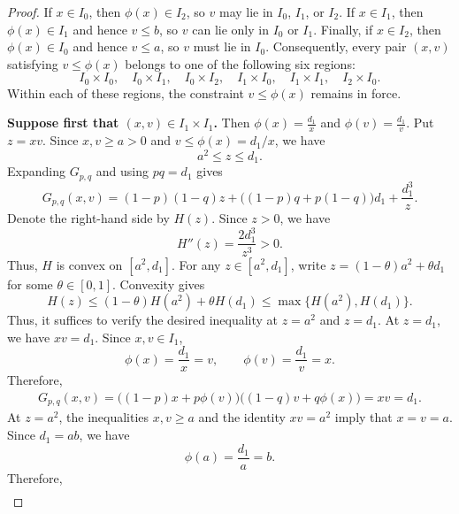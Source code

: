 \documentclass[10pt,a4paper]{amsart}
\begin{document}
\begin{proof}
If $x\in I_0$, then $\phi(x)\in I_2$, so $v$ may lie in $I_0$,
$I_1$, or $I_2$. If $x\in I_1$, then $\phi(x)\in I_1$ and hence
$v\leq b$, so $v$ can lie only in $I_0$ or $I_1$. Finally, if
$x\in I_2$, then $\phi(x)\in I_0$ and hence $v\leq a$, so
$v$ must lie in $I_0$.
Consequently, every pair $(x,v)$ satisfying $v\leq\phi(x)$ belongs to
one of the following six regions:
\begin{equation*}
 I_0\times I_0,\quad
 I_0\times I_1,\quad
 I_0\times I_2,\quad
 I_1\times I_0,\quad
 I_1\times I_1,\quad
 I_2\times I_0.
\end{equation*}
Within each of these regions, the constraint $v\leq\phi(x)$ remains in
force.


\textbf{Suppose first that $(x,v)\in I_1\times I_1$.} Then
$
 \phi(x)=\frac{d_1}{x}
$
and 
$
 \phi(v)=\frac{d_1}{v}.
$
Put $z=xv$. Since $x,v\geq a>0$ and $v\leq \phi(x)=d_1/x$, we have
\begin{equation*}
 a^2\leq z\leq d_1.
\end{equation*}
Expanding $G_{p,q}$ and using $pq=d_1$ gives
\begin{equation*}
 G_{p,q}(x,v)
 =
 (1-p)(1-q)z
 +
 \bigl((1-p)q+p(1-q)\bigr)d_1
 +
 \frac{d_1^3}{z}.
\end{equation*}
Denote the right-hand side by
$
 H(z).
$
Since $z>0$, we have
\begin{equation*}
 H''(z)=\frac{2d_1^3}{z^3}>0.
\end{equation*}
Thus, $H$ is convex on $[a^2,d_1]$. For any
$z\in[a^2,d_1]$, write
$
 z=(1-\theta)a^2+\theta d_1
$
for some $\theta\in[0,1]$. Convexity gives
\begin{equation*}
 H(z)
 \leq
 (1-\theta)H(a^2)+\theta H(d_1)
 \leq
 \max\{H(a^2),H(d_1)\}.
\end{equation*}
Thus, it suffices to verify the desired inequality at
$z=a^2$ and $z=d_1$. 
At $z=d_1$, we have $xv=d_1$. Since $x,v\in I_1$,
\begin{equation*}
 \phi(x)=\frac{d_1}{x}=v,
 \qquad
 \phi(v)=\frac{d_1}{v}=x.
\end{equation*}
Therefore,
\begin{align*}
 G_{p,q}(x,v)
 =
 \bigl((1-p)x+p\phi(v)\bigr)
 \bigl((1-q)v+q\phi(x)\bigr)=xv=d_1.
\end{align*} At $z=a^2$, the inequalities $x,v\geq a$ and the identity
$xv=a^2$ imply that $x=v=a$. Since $d_1=ab$, we have
\begin{equation*}
 \phi(a)=\frac{d_1}{a}=b.
\end{equation*}
Therefore,
\begin{align*}

\end{align*}
\end{proof}
\end{document}
